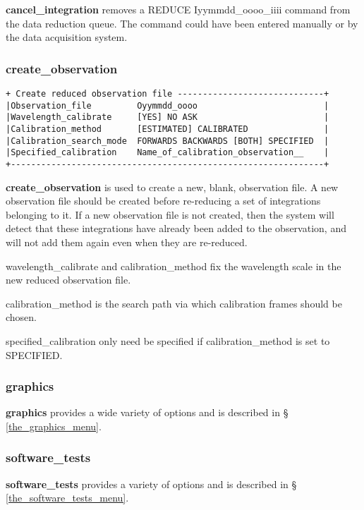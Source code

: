 {{\bf cancel\_integration} removes a {\sf REDUCE Iyymmdd\_oooo\_iiii} command
from the data reduction queue. The command could have been entered manually 
or by the data acquisition system.

\subsubsection{create\_observation}
\begin{verbatim}
+ Create reduced observation file -----------------------------+
|Observation_file         Oyymmdd_oooo                         |
|Wavelength_calibrate     [YES] NO ASK                         |
|Calibration_method       [ESTIMATED] CALIBRATED               |
|Calibration_search_mode  FORWARDS BACKWARDS [BOTH] SPECIFIED  |
|Specified_calibration    Name_of_calibration_observation__    |
+--------------------------------------------------------------+
\end{verbatim}

{\bf create\_observation} is used to create a new, blank, observation 
file. A new observation file should be created before re-reducing 
a set of integrations belonging to it. If a new observation file is 
not created, then the system will detect 
that these integrations have already been added to the observation, and 
will not add them again even when they are re-reduced.

{\sf wavelength\_calibrate}  and {\sf calibration\_method} fix the
wavelength scale in the new reduced observation file.

{\sf calibration\_method} is the search path via which calibration frames
should be chosen.

{\sf specified\_calibration} only need be specified if 
{\sf calibration\_method} is set to {\sf SPECIFIED}.

\subsubsection{graphics}
\label{graphics_2}

{\bf graphics} provides a wide variety of options and is described in \S 
\ref{the_graphics_menu}.

\subsubsection{software\_tests}
\label{software_tests}

{\bf software\_tests} provides a variety of options and is described in \S 
\ref{the_software_tests_menu}.

}

